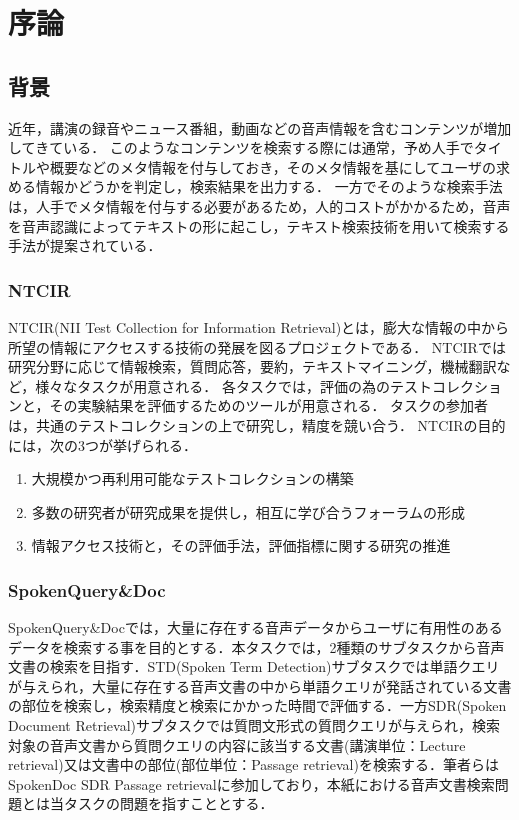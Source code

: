 ﻿%

\chapter{序論} %
\section{背景}
近年，講演の録音やニュース番組，動画などの音声情報を含むコンテンツが増加してきている．
このようなコンテンツを検索する際には通常，予め人手でタイトルや概要などのメタ情報を付与しておき，そのメタ情報を基にしてユーザの求める情報かどうかを判定し，検索結果を出力する．
一方でそのような検索手法は，人手でメタ情報を付与する必要があるため，人的コストがかかるため，音声を音声認識によってテキストの形に起こし，テキスト検索技術を用いて検索する手法が提案されている．


\subsection{NTCIR}
NTCIR(NII Test Collection for Information Retrieval)\cite{NTCIR}とは，膨大な情報の中から所望の情報にアクセスする技術の発展を図るプロジェクトである．
NTCIRでは研究分野に応じて情報検索，質問応答，要約，テキストマイニング，機械翻訳など，様々なタスクが用意される．
各タスクでは，評価の為のテストコレクションと，その実験結果を評価するためのツールが用意される．
タスクの参加者は，共通のテストコレクションの上で研究し，精度を競い合う．
NTCIRの目的には，次の3つが挙げられる．
\begin{enumerate}
    \item 大規模かつ再利用可能なテストコレクションの構築
    \item 多数の研究者が研究成果を提供し，相互に学び合うフォーラムの形成
    \item 情報アクセス技術と，その評価手法，評価指標に関する研究の推進
\end{enumerate}

\subsection{SpokenQuery\&Doc}
SpokenQuery\&Docでは，大量に存在する音声データからユーザに有用性のあるデータを検索する事を目的とする．本タスクでは，2種類のサブタスクから音声文書の検索を目指す．STD(Spoken Term Detection)サブタスクでは単語クエリが与えられ，大量に存在する音声文書の中から単語クエリが発話されている文書の部位を検索し，検索精度と検索にかかった時間で評価する．一方SDR(Spoken Document Retrieval)サブタスクでは質問文形式の質問クエリが与えられ，検索対象の音声文書から質問クエリの内容に該当する文書(講演単位：Lecture retrieval)又は文書中の部位(部位単位：Passage retrieval)を検索する．筆者らはSpokenDoc SDR Passage retrievalに参加しており，本紙における音声文書検索問題とは当タスクの問題を指すこととする．

